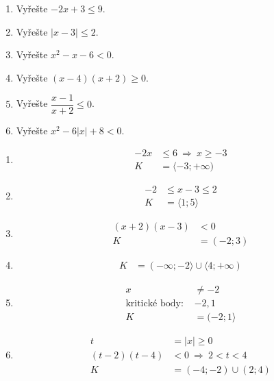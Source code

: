 \documentclass[11pt,a4paper]{article}
\begin{document}
\begin{zadaniReseniBox}[title={Domácí úkol}]
\begin{enumerate}[label=\alph*),itemsep=2pt]
\item Vyřešte $-2x+3\le9$.
\item Vyřešte $|x-3|\le2$.
\item Vyřešte $x^2-x-6<0$.
\item Vyřešte $(x-4)(x+2)\ge0$.
\item Vyřešte $\dfrac{x-1}{x+2}\le0$.
\item Vyřešte $x^2-6|x|+8<0$.
\end{enumerate}
\tcblower
\begin{enumerate}[label=\alph*),itemsep=2pt]
\item
\[
\begin{aligned}
-2x&\le6\ \Rightarrow\ x\ge-3\\
K&=\langle-3;+\infty)
\end{aligned}
\]
\item
\[
\begin{aligned}
-2&\le x-3\le2\\
K&=\langle1;5\rangle
\end{aligned}
\]
\item
\[
\begin{aligned}
(x+2)(x-3)&<0\\
K&=(-2;3)
\end{aligned}
\]
\item
\[
\begin{aligned}
K&=(-\infty;-2\rangle\cup\langle4;+\infty)
\end{aligned}
\]
\item
\[
\begin{aligned}
x&\ne-2\\
\text{kritické body: }&-2,1\\
K&=(-2;1\rangle
\end{aligned}
\]
\item
\[
\begin{aligned}
t&=|x|\ge0\\
(t-2)(t-4)&<0\ \Rightarrow\ 2<t<4\\
K&=(-4;-2)\cup(2;4)
\end{aligned}
\]
\end{enumerate}
\end{zadaniReseniBox}
\end{document}
